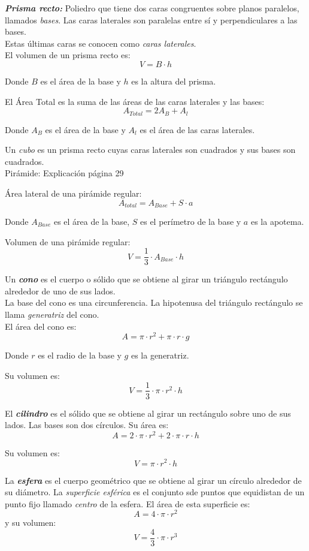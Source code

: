 \textbf{\emph{Prisma recto:}} Poliedro que tiene dos caras congruentes sobre planos paralelos, llamados \emph{bases}. Las caras laterales son paralelas entre sí y perpendiculares a las bases.\\
Estas últimas caras se conocen como \emph{caras laterales}. \\

El volumen de un prisma recto es:
$$\boxed{V = B \cdot h}$$
\begin{center}
    Donde $B$ es el área de la base y $h$ es la altura del prisma.
\end{center}

El Área Total es la suma de las áreas de las caras laterales y las bases:
$$\boxed{A_{Total} = 2 A_B + A_l}$$
\begin{center}
    Donde $A_B$ es el área de la base y $A_l$ es el área de las caras laterales.
\end{center}

Un \emph{cubo} es un prisma recto cuyas caras laterales son cuadrados y sus bases son cuadrados.\\

\noindent Pirámide: Explicación página 29

Área lateral de una pirámide regular:
$$\boxed{A_{total} = A_{Base} + S \cdot a}$$
\begin{center}
    Donde $A_{Base}$ es el área de la base, $S$ es el perímetro de la base y $a$ es la apotema.
\end{center}

Volumen de una pirámide regular:
$$\boxed{V = \frac{1}{3} \cdot A_{Base} \cdot h}$$

\noindent Un \emph{\textbf{cono}} es el cuerpo o sólido que se obtiene al girar un triángulo rectángulo alrededor de uno de sus lados.\\ La base del cono es una circunferencia. La hipotenusa del triángulo rectángulo se llama \emph{generatriz} del cono.\\

El área del cono es: 
$$\boxed{A = \pi \cdot r^2 + \pi \cdot r \cdot g}$$
\begin{center}
    Donde $r$ es el radio de la base y $g$ es la generatriz.
\end{center}
Su volumen es:
$$\boxed{V = \frac{1}{3} \cdot \pi \cdot r^2 \cdot h}$$

El \emph{\textbf{cilindro}} es el sólido que se obtiene al girar un rectángulo sobre uno de sus lados. Las bases son dos círculos. Su área es:
$$\boxed{A = 2 \cdot \pi \cdot r^2 + 2 \cdot \pi \cdot r \cdot h}$$

Su volumen es:
$$\boxed{V = \pi \cdot r^2 \cdot h}$$

La \emph{\textbf{esfera}} es el cuerpo geométrico que se obtiene al girar un círculo alrededor de su diámetro. La \emph{superficie esférica} es el conjunto sde puntos que equidistan de un punto fijo llamado \emph{centro} de la esfera. El área de esta superficie es:
$$\boxed{A = 4 \cdot \pi \cdot r^2}$$
y su volumen:
$$\boxed{V = \frac{4}{3} \cdot \pi \cdot r^3}$$
